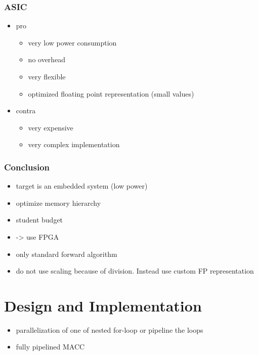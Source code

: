 \documentclass[mscthesis]{usiinfthesis}
\begin{document}
\subsection{ASIC}
\begin{itemize}
    \item pro
    \begin{itemize}
        \item very low power consumption
        \item no overhead
        \item very flexible
        \item optimized floating point representation (small values)
    \end{itemize}
    \item contra
    \begin{itemize}
        \item very expensive
        \item very complex implementation
    \end{itemize}
\end{itemize}

\subsection{Conclusion}
\begin{itemize}
    \item target is an embedded system (low power)
    \item optimize memory hierarchy
    \item student budget
    \item -> use FPGA
    \item only standard forward algorithm
    \item do not use scaling because of division. Instead use custom FP
        representation
\end{itemize}


\chapter{Design and Implementation}
\label{ch:design}

\begin{itemize}
    \item parallelization of one of nested for-loop or pipeline the loops
    \item fully pipelined MACC
\end{itemize}
\end{document}
